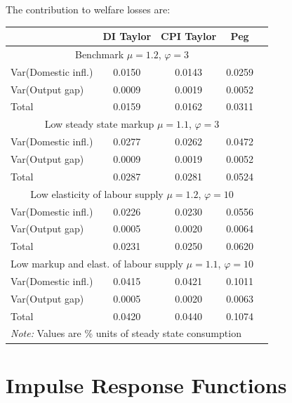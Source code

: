 \documentclass{article}
\begin{document}
\begin{minipage}{0.47\textwidth}
    The contribution to welfare losses are:
    \begin{table}[H]
        \centering
        \begin{tabular}{lcccc}
            \hline
            &  DI Taylor & CPI Taylor & Peg\\
            \hline
            \multicolumn{4}{c}{Benchmark $\mu = 1.2$, $\varphi = 3$}\\
            Var(Domestic infl.) & 0.0150 & 0.0143 & 0.0259 \\
            Var(Output gap) & 0.0009 & 0.0019 & 0.0052 \\
            Total & 0.0159 & 0.0162 & 0.0311 \\
            \multicolumn{4}{c}{Low steady state markup $\mu = 1.1$, $\varphi = 3$}\\
            Var(Domestic infl.) & 0.0277 & 0.0262 & 0.0472 \\
            Var(Output gap) & 0.0009 & 0.0019 & 0.0052 \\
            Total & 0.0287 & 0.0281 & 0.0524 \\
            \multicolumn{4}{c}{Low elasticity of labour supply $\mu = 1.2$, $\varphi = 10$}\\
            Var(Domestic infl.) & 0.0226 & 0.0230 & 0.0556 \\
            Var(Output gap) & 0.0005 & 0.0020 & 0.0064 \\
            Total & 0.0231 & 0.0250 & 0.0620 \\
            \multicolumn{4}{c}{Low markup and elast. of labour supply $\mu = 1.1$, $\varphi = 10$}\\
            Var(Domestic infl.) & 0.0415 & 0.0421 & 0.1011 \\
            Var(Output gap) & 0.0005 & 0.0020 & 0.0063 \\
            Total & 0.0420 & 0.0440 & 0.1074 \\
            \hline
            \multicolumn{4}{l}{\textit{Note: } Values are \% units of steady state consumption}
        \end{tabular}
    \end{table}
\end{minipage}

\section{Impulse Response Functions}
\end{document}

